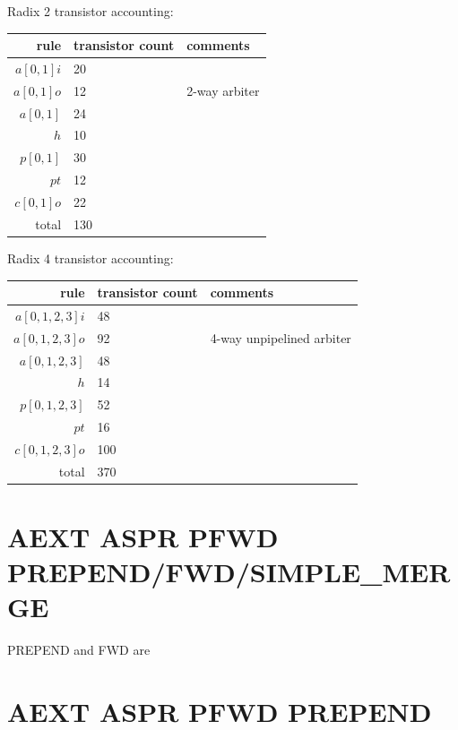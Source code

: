 \documentclass{article}
\begin{document}
\noindent
Radix 2 transistor accounting:

\begin{center}
    \begin{tabular}{|r|l|l|}
    \hline
    rule & transistor count & comments \\ \hline
    $a[0,1]i$ & 20 & \\ \hline
    $a[0,1]o$ & 12 & 2-way arbiter \\ \hline
    $a[0,1]$ & 24 & \\ \hline
    $h$ & 10 & \\ \hline
    $p[0,1]$ & 30 & \\ \hline
    $pt$ & 12 & \\ \hline
    $c[0,1]o$ & 22 & \\ \hline
    \hline total & 130 & \\ \hline
    \end{tabular}
\end{center}

\noindent
Radix 4 transistor accounting:

\begin{center}
    \begin{tabular}{|r|l|l|}
    \hline
    rule & transistor count & comments \\ \hline
    $a[0,1,2,3]i$ & 48 & \\ \hline
    $a[0,1,2,3]o$ & 92 & 4-way unpipelined arbiter \\ \hline
    $a[0,1,2,3]$ & 48 & \\ \hline
    $h$ & 14 & \\ \hline
    $p[0,1,2,3]$ & 52 & \\ \hline
    $pt$ & 16 & \\ \hline
    $c[0,1,2,3]o$ & 100 & \\ \hline
    \hline total & 370 & \\ \hline
    \end{tabular}
\end{center}

\section{AEXT ASPR PFWD PREPEND/FWD/SIMPLE\_MERGE}

PREPEND and FWD are

\section{AEXT ASPR PFWD PREPEND}
\end{document}
